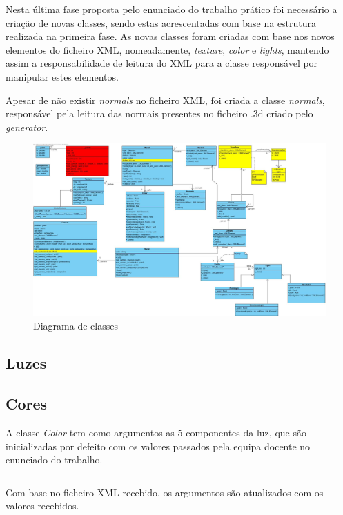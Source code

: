 \documentclass[relatorio.tex]{subfiles}
\begin{document}
Nesta última fase proposta pelo enunciado do trabalho prático foi necessário a 
criação de novas classes, sendo estas acrescentadas com base na estrutura realizada
na primeira fase. As novas classes foram criadas com base nos novos elementos do ficheiro
XML, nomeadamente, \textit{texture}, \textit{color} e \textit{lights}, mantendo assim a 
responsabilidade de leitura do XML para a classe responsável por manipular estes elementos.

Apesar de não existir \textit{normals} no ficheiro XML, foi criada a classe \textit{normals},
responsável pela leitura das normais presentes no ficheiro .3d criado pelo \textit{generator}.

\begin{landscape}
    \begin{figure}
        \centering
        \includegraphics[width=\linewidth]{assets/classe.jpg}
        \caption{Diagrama de classes} \label{fig:dig_classes}
    \end{figure}
\end{landscape}

\subsection{Luzes}


\subsection{Cores}
A classe \textit{Color} tem como argumentos as 5 componentes da luz,
que são inicializadas por defeito com os valores passados pela equipa docente
no enunciado do trabalho. 

\inputminted[firstline=19, lastline=25]{cpp}{../../Color.h}

Com base no ficheiro XML recebido, os argumentos são atualizados com os valores 
recebidos.
\end{document}
